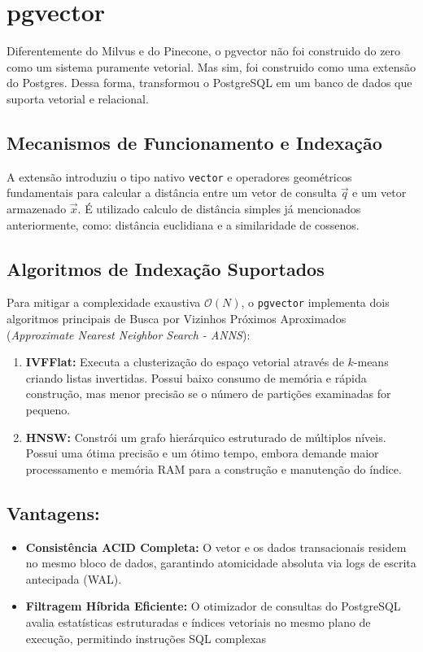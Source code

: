 \documentclass[a4paper, 12pt]{article} %
\begin{document}
\section{ pgvector }
Diferentemente do Milvus e do Pinecone, o pgvector não foi construido do zero como um sistema puramente vetorial. Mas sim, foi construido como uma extensão do Postgres. Dessa forma, transformou o PostgreSQL em um banco de dados que suporta vetorial e relacional.

\subsection{Mecanismos de Funcionamento e Indexação}

A extensão introduziu o tipo nativo \texttt{vector} e operadores geométricos fundamentais para calcular a distância entre um vetor de consulta $\vec{q}$ e um vetor armazenado $\vec{x}$. É utilizado calculo de distância simples já mencionados anteriormente, como: distância euclidiana e a similaridade de cossenos.

\subsection{Algoritmos de Indexação Suportados}
Para mitigar a complexidade exaustiva $\mathcal{O}(N)$, o \texttt{pgvector} implementa dois algoritmos principais de Busca por Vizinhos Próximos Aproximados (\textit{Approximate Nearest Neighbor Search - ANNS}):
\begin{enumerate}
    \item \textbf{IVFFlat:} Executa a clusterização do espaço vetorial através de $k$-means criando listas invertidas. Possui baixo consumo de memória e rápida construção, mas menor precisão se o número de partições examinadas for pequeno.
    \item \textbf{HNSW:} Constrói um grafo hierárquico estruturado de múltiplos níveis. Possui uma ótima precisão e um ótimo tempo, embora demande maior processamento e memória RAM para a construção e manutenção do índice.
\end{enumerate}

\subsection{Vantagens:}
\begin{itemize}
    \item \textbf{Consistência ACID Completa:} O vetor e os dados transacionais residem no mesmo bloco de dados, garantindo atomicidade absoluta via logs de escrita antecipada (WAL).
    \item \textbf{Filtragem Híbrida Eficiente:} O otimizador de consultas do PostgreSQL avalia estatísticas estruturadas e índices vetoriais no mesmo plano de execução, permitindo instruções SQL complexas
\end{itemize}
\end{document}
